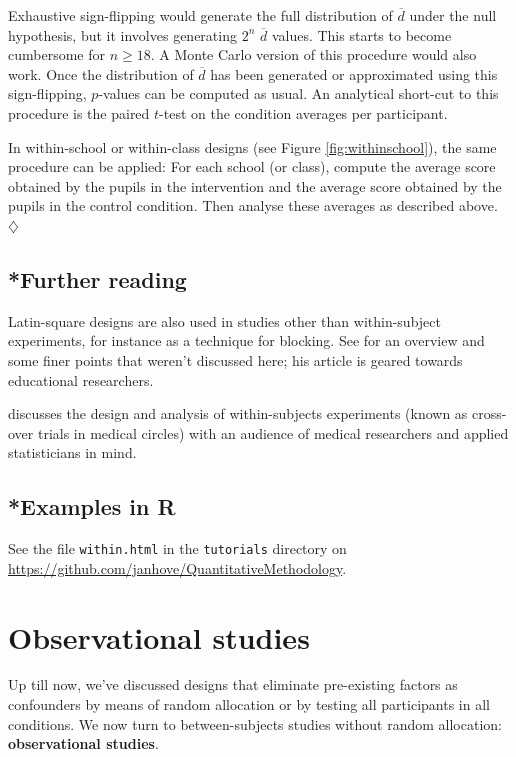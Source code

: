 \documentclass[a4paper]{tufte-book}\usepackage[]{graphicx}\usepackage[]{xcolor}
\newcommand{\term}[1]{\textbf{#1}}
\newcommand*{\parend}[1][$\diamondsuit$]{%
  \unskip\nobreak\hspace{1em plus 1fill}$\diamondsuit$%
}
\begin{document}
Exhaustive sign-flipping would generate the full distribution of $\overline d$
under the null hypothesis, but it involves generating $2^n$ $\overline d$ values.
This starts to become cumbersome for $n \geq 18$.
A Monte Carlo version of this procedure would also work.
Once the distribution of $\overline d$ has been generated or approximated using this sign-flipping,
$p$-values can be computed as usual.
An analytical short-cut to this procedure is the paired $t$-test on the condition averages per participant.
  
  In within-school or within-class designs (see Figure \vref{fig:withinschool}),
  the same procedure can be applied: For each school (or class), compute
  the average score obtained by the pupils in the intervention and the average
  score obtained by the pupils in the control condition.
  Then analyse these averages as described above.
\parend

\section{*Further reading}
Latin-square designs are also used in studies other than 
within-subject experiments, for instance as a technique for blocking.
See \citet{Richardson2018} for an overview and some finer points that weren't discussed here; 
his article is geared towards educational researchers.

\citet{Senn2002} discusses the design and analysis of within-subjects experiments
(known as cross-over trials in medical circles)
with an audience of medical researchers and applied statisticians in mind.

\section{*Examples in R}
See the file \texttt{within.html} in the \texttt{tutorials} directory
on \url{https://github.com/janhove/QuantitativeMethodology}.


\chapter{Observational studies}\label{ch:quasi}
Up till now, we've discussed designs that eliminate pre-existing
factors as confounders by means of random allocation or by testing all participants
in all conditions.
We now turn to between-subjects studies without random allocation:
\term{observational studies}.
\end{document}
